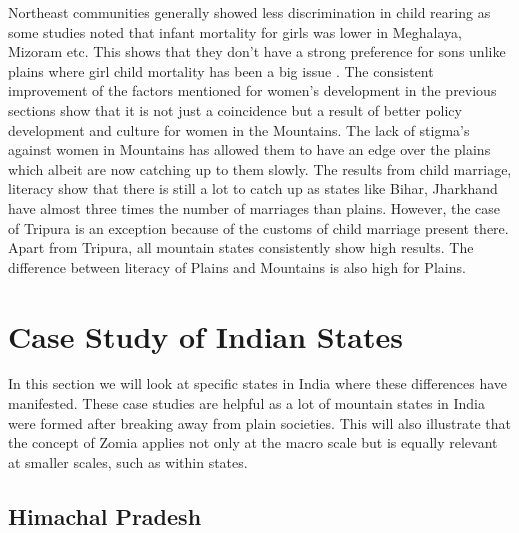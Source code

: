 Northeast communities generally showed less discrimination in child rearing as some studies noted that infant mortality for girls was lower in Meghalaya, Mizoram etc. This shows that they don't have a strong preference for sons unlike plains where girl child mortality has been a big issue \citep{mahanta2013gender}. The  consistent improvement of the factors mentioned for women's development in the previous sections show that it is not just a coincidence but a result of better policy development and culture for women in the Mountains. The lack of stigma's against women in Mountains has allowed them to have an edge over the plains which albeit are now catching up to them slowly. The results from child marriage, literacy show that there is still a lot to catch up as states like Bihar, Jharkhand have almost three times the number of marriages than plains. However, the case of Tripura is an exception because of the customs of child marriage present there. Apart from Tripura, all mountain states consistently show high results. The difference between literacy of Plains and Mountains is also high for Plains.

\section{Case Study of Indian States}
In this section we will look at specific states in India where these differences have manifested. These case studies are helpful as a lot of mountain states in India were formed after breaking away from plain societies. This will also illustrate that the concept of Zomia applies not only at the macro scale but is equally relevant at smaller scales, such as within states.

\subsection{Himachal Pradesh}

